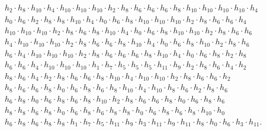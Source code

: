 \[
\begin{aligned}
	& h_{2} \cdot h_{8} \cdot h_{10} \cdot h_{4} \cdot h_{10} \cdot h_{10} \cdot h_{10} \cdot h_{2} \cdot h_{8} \cdot h_{6} \cdot h_{6} \cdot h_{6} \cdot h_{8} \cdot h_{10} \cdot h_{10} \cdot h_{10} \cdot h_{10} \cdot h_{4} \\ &
	h_{0} \cdot h_{6} \cdot h_{2} \cdot h_{8} \cdot h_{8} \cdot h_{10} \cdot h_{4} \cdot h_{0} \cdot h_{6} \cdot h_{8} \cdot h_{10} \cdot h_{10} \cdot h_{10} \cdot h_{2} \cdot h_{8} \cdot h_{6} \cdot h_{6} \cdot h_{4} \\ &
	h_{10} \cdot h_{10} \cdot h_{10} \cdot h_{2} \cdot h_{8} \cdot h_{6} \cdot h_{8} \cdot h_{10} \cdot h_{4} \cdot h_{0} \cdot h_{6} \cdot h_{8} \cdot h_{10} \cdot h_{10} \cdot h_{2} \cdot h_{8} \cdot h_{6} \cdot h_{6} \\ &
	h_{4} \cdot h_{10} \cdot h_{10} \cdot h_{10} \cdot h_{2} \cdot h_{8} \cdot h_{6} \cdot h_{6} \cdot h_{8} \cdot h_{10} \cdot h_{4} \cdot h_{0} \cdot h_{6} \cdot h_{8} \cdot h_{10} \cdot h_{2} \cdot h_{8} \cdot h_{6} \\ &
	h_{6} \cdot h_{4} \cdot h_{10} \cdot h_{10} \cdot h_{10} \cdot h_{2} \cdot h_{8} \cdot h_{6} \cdot h_{6} \cdot h_{6} \cdot h_{8} \cdot h_{10} \cdot h_{4} \cdot h_{0} \cdot h_{6} \cdot h_{8} \cdot h_{2} \cdot h_{8} \\ &
	h_{6} \cdot h_{6} \cdot h_{4} \cdot h_{10} \cdot h_{10} \cdot h_{10} \cdot h_{1} \cdot h_{7} \cdot h_{5} \cdot h_{5} \cdot h_{5} \cdot h_{11} \cdot h_{9} \cdot h_{2} \cdot h_{8} \cdot h_{6} \cdot h_{4} \cdot h_{2} \\ &
	h_{8} \cdot h_{6} \cdot h_{4} \cdot h_{2} \cdot h_{8} \cdot h_{6} \cdot h_{6} \cdot h_{8} \cdot h_{10} \cdot h_{4} \cdot h_{10} \cdot h_{10} \cdot h_{2} \cdot h_{8} \cdot h_{6} \cdot h_{6} \cdot h_{2} \\ &
	h_{8} \cdot h_{6} \cdot h_{6} \cdot h_{8} \cdot h_{0} \cdot h_{6} \cdot h_{8} \cdot h_{6} \cdot h_{8} \cdot h_{10} \cdot h_{4} \cdot h_{10} \cdot h_{8} \cdot h_{6} \cdot h_{2} \cdot h_{8} \cdot h_{6} \\ &
	h_{6} \cdot h_{8} \cdot h_{0} \cdot h_{6} \cdot h_{8} \cdot h_{6} \cdot h_{8} \cdot h_{10} \cdot h_{2} \cdot h_{8} \cdot h_{6} \cdot h_{6} \cdot h_{8} \cdot h_{0} \cdot h_{6} \cdot h_{8} \cdot h_{6} \\ &
	h_{8} \cdot h_{8} \cdot h_{6} \cdot h_{8} \cdot h_{0} \cdot h_{6} \cdot h_{8} \cdot h_{6} \cdot h_{8} \cdot h_{8} \cdot h_{0} \cdot h_{6} \cdot h_{8} \cdot h_{6} \cdot h_{8} \cdot h_{10} \cdot h_{0} \\ &
	h_{6} \cdot h_{8} \cdot h_{6} \cdot h_{8} \cdot h_{8} \cdot h_{1} \cdot h_{7} \cdot h_{5} \cdot h_{11} \cdot h_{9} \cdot h_{3} \cdot h_{11} \cdot h_{9} \cdot h_{11} \cdot h_{8} \cdot h_{0} \cdot h_{6} \cdot h_{3} \cdot h_{11}.
\end{aligned}
\]

